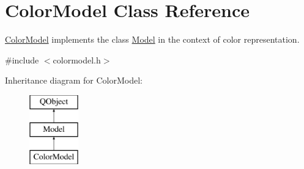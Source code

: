 \hypertarget{class_color_model}{}\section{Color\+Model Class Reference}
\label{class_color_model}


\hyperlink{class_color_model}{Color\+Model} implements the class \hyperlink{class_model}{Model} in the context of color representation.  




{\ttfamily \#include $<$colormodel.\+h$>$}

Inheritance diagram for Color\+Model\+:\begin{figure}[H]
\begin{center}
\leavevmode
\includegraphics[height=3.000000cm]{class_color_model}
\end{center}
\end{figure}
